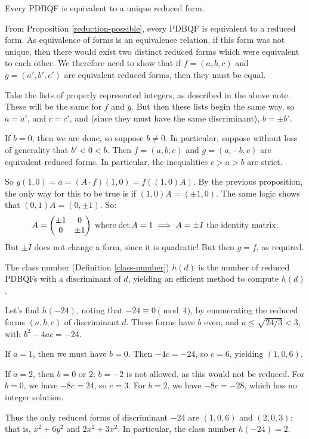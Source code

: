 \documentclass{article}
\begin{document}
\begin{theorem}
    Every PDBQF is equivalent to a unique reduced form.
\end{theorem}

\begin{prf}
    From Proposition \ref{reduction-possible}, every PDBQF is equivalent to a reduced form.
    As equivalence of forms is an equivalence relation, if this form was not unique, then there would exist two distinct reduced forms which were equivalent to each other.
	We therefore need to show that if $f = (a, b, c)$ and $g = (a', b', c')$ are equivalent reduced forms, then they must be equal.
	
	Take the lists of properly represented integers, as described in the above note. These will be the same for $f$ and $g$. But then these lists begin the same way, so $a = a'$, and $c = c'$, and (since they must have the same discriminant), $b = \pm b'$.
	
	If $b = 0$, then we are done, so suppose $b \neq 0$. In particular, suppose without loss of generality that $b' < 0 < b$. Then $f = (a, b, c)$ and $g = (a, -b, c)$ are equivalent reduced forms. In particular, the inequalities $c > a > b$ are strict.
	
	So $g(1, 0) = a = (A \cdot f)(1, 0) = f((1, 0)A)$. By the previous proposition, the only way for this to be true is if $(1, 0)A = (\pm 1, 0)$. The same logic shows that $(0, 1)A = (0, \pm 1)$. So:
	\[
	A = \begin{pmatrix}
		\pm 1 & 0 \\ 0 & \pm 1
	\end{pmatrix}
	\mathrel{\, \text{where}}
	\det A = 1 \implies A = \pm I
	\text{ the identity matrix.}
	\]
	But $\pm I$ does not change a form, since it is quadratic! But then $g = f$, as required.
\end{prf}

\begin{corollary}
    The class number (Definition \ref{class-number}) $h(d)$ is the number of reduced PDBQFs with a discriminant of $d$, yielding an efficient method to compute $h(d)$.
\end{corollary}

\begin{example}
    Let's find $h(-24)$, noting that $- 24 \equiv 0 \pmod 4$, by enumerating the reduced forms $(a, b, c)$ of discriminant $d$. These forms have $b$ even, and $a \leq \sqrt{24/3} < 3$, with $b^2 - 4ac = -24$.

	If $a = 1$, then we must have $b = 0$. Then $-4c = -24$, so $c = 6$, yielding $(1, 0, 6)$.
	
	If $a = 2$, then $b = 0$ or $2$: $b = -2$ is not allowed, as this would not be reduced. For $b = 0$, we have $-8c = 24$, so $c = 3$. For $b = 2$, we have $-8c = -28$, which has no integer solution.
	
	Thus the only reduced forms of discriminant $-24$ are $(1, 0, 6)$ and $(2, 0, 3)$: that is, $x^2 + 6y^2$ and $2x^2 + 3x^2$. In particular, the class number $h(-24) = 2$.
\end{example}
\end{document}

